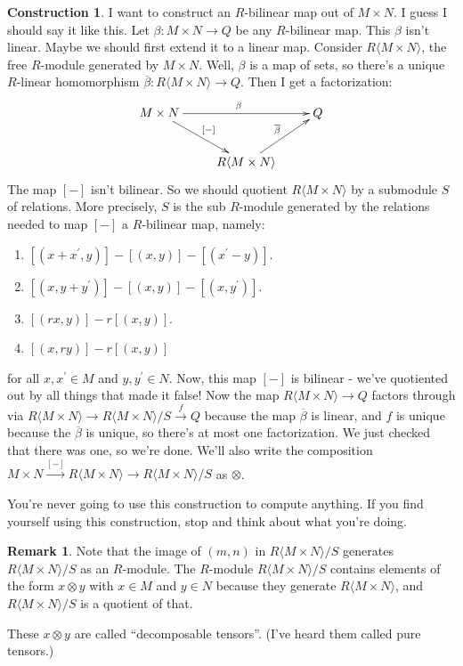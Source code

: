 \documentclass{amsart}
\theoremstyle{theorem}
\theoremstyle{definition}
\newtheorem{construction}[theorem]{Construction}
\newtheorem{remark}[theorem]{Remark}
\begin{document}
\begin{construction}
I want to construct an $R$-bilinear map out of $M\times N$. I guess I should say it like this. Let $\beta:M\times N\to Q$ be any $R$-bilinear map. This $\beta$ isn't linear. Maybe we should first extend it to a linear map. Consider $R\langle M\times N\rangle$, the free $R$-module generated by $M\times N$. Well, $\beta$ is a map of sets, so there's a unique $R$-linear homomorphism $\overline{\beta}:R\langle M\times N\rangle\to Q$. Then I get a factorization:
\begin{equation*}
\xymatrix{M\times N\ar[rr]^\beta\ar[dr]^{[-]} & & Q\\
& R\langle M\times N\rangle\ar[ur]^{\overline{\beta}} &}
\end{equation*}
The map $[-]$ isn't bilinear. So we should quotient $R\langle M\times N\rangle$ by a submodule $S$ of relations. More precisely, $S$ is the sub $R$-module generated by the relations needed to map $[-]$ a $R$-bilinear map, namely:
\begin{enumerate}
\item $[(x+x^\prime,y)]-[(x,y)]-[(x^\prime-y)]$.
\item $[(x,y+y^\prime)]-[(x,y)]-[(x,y^\prime)]$.
\item $[(rx,y)]-r[(x,y)]$.
\item $[(x,ry)]-r[(x,y)]$
\end{enumerate}
for all $x,x^\prime\in M$ and $y,y^\prime\in N$. Now, this map $[-]$ is bilinear - we've quotiented out by all things that made it false! Now the map $R\langle M\times N\rangle\to Q$ factors through via $R\langle M\times N\rangle\to R\langle M\times N\rangle/S\xrightarrow{f} Q$ because the map $\overline{\beta}$ is linear, and $f$ is unique because the $\overline{\beta}$ is unique, so there's at most one factorization. We just checked that there was one, so we're done. We'll also write the composition $M\times N\xrightarrow{[-]}R\langle M\times N\rangle\to R\langle M\times N\rangle/S$ as $\otimes$.
\end{construction}
You're never going to use this construction to compute anything. If you find yourself using this construction, stop and think about what you're doing.
\begin{remark}
Note that the image of $(m,n)$ in $R\langle M\times N\rangle/S$ generates $R\langle M\times N\rangle/S$ as an $R$-module. The $R$-module $R\langle M\times N\rangle/S$ contains elements of the form $x\otimes y$ with $x\in M$ and $y\in N$ because they generate $R\langle M\times N\rangle$, and $R\langle M\times N\rangle/S$ is a quotient of that.

These $x\otimes y$ are called ``decomposable tensors''. (I've heard them called pure tensors.)
\end{remark}
\end{document}
